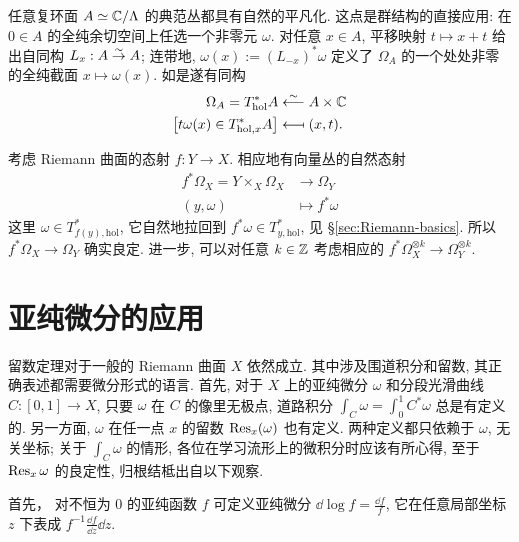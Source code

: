 \begin{example}\label{eg:canonical-bundle-tori}
	任意复环面 $A \simeq \mathbb{C}/\Lambda$ 的典范丛都具有自然的平凡化. 这点是群结构的直接应用: 在 $0 \in A$ 的全纯余切空间上任选一个非零元 $\omega$. 对任意 $x \in A$, 平移映射 $t \mapsto x+t$ 给出自同构 $L_x: A \stackrel{\sim}{\rightarrow} A$; 连带地, $\omega(x) := (L_{-x})^* \omega$ 定义了 $\Omega_A$ 的一个处处非零的全纯截面 $x \mapsto \omega(x)$. 如是遂有同构
	\begin{align*}
		\Omega_A = T^*_{\text{hol}} A & \stackrel{\sim}{\longleftarrow} A \times \mathbb{C} \\
		\left[ t\omega(x) \in T^*_{\text{hol}, x} A \right] & \longmapsfrom (x, t).
	\end{align*}
\end{example}

考虑 Riemann 曲面的态射 $f: Y \to X$. 相应地有向量丛的自然态射
\begin{align*}
	f^* \Omega_X = Y \times_X \Omega_X & \longrightarrow \Omega_Y \\
	(y, \omega) & \longmapsto f^* \omega
\end{align*}
这里 $\omega \in T^*_{f(y), \text{hol}}$, 它自然地拉回到 $f^* \omega \in T^*_{y, \text{hol}}$, 见 \S\ref{sec:Riemann-basics}. 所以 $f^* \Omega_X \to \Omega_Y$ 确实良定. 进一步, 可以对任意 $k \in \mathbb{Z}$ 考虑相应的 $f^* \Omega_X^{\otimes k} \to \Omega_Y^{\otimes k}$.

\section{亚纯微分的应用}
留数定理对于一般的 Riemann 曲面 $X$ 依然成立. 其中涉及围道积分和留数, 其正确表述都需要微分形式的语言. 首先, 对于 $X$ 上的亚纯微分 $\omega$ 和分段光滑曲线 $C: [0,1] \to X$, 只要 $\omega$ 在 $C$ 的像里无极点, 道路积分 $\int_C \omega = \int_0^1 C^* \omega$ 总是有定义的. 另一方面, $\omega$ 在任一点 $x$ 的留数 $\operatorname{Res}_x(\omega)$ 也有定义. 两种定义都只依赖于 $\omega$, 无关坐标; 关于 $\int_C \omega$ 的情形, 各位在学习流形上的微积分时应该有所心得, 至于 $\operatorname{Res}_x \omega$ 的良定性, 归根结柢出自以下观察.

首先， 对不恒为 $0$ 的亚纯函数 $f$ 可定义亚纯微分 $\dd\log f = \frac{\dd f}{f}$, 它在任意局部坐标 $z$ 下表成 $f^{-1} \frac{\dd f}{\dd z} \dd z$.

